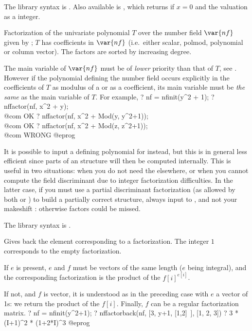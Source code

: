 The library syntax is .
Also available is
, which returns
 if $x = 0$ and the valuation as a  integer.

\label{se:nffactor}
Factorization of the univariate
polynomial $T$ over the number field $\var{nf}$ given by ; $T$
has coefficients in $\var{nf}$ (i.e.~either scalar, polmod, polynomial or
column vector). The factors are sorted by increasing degree.

The main variable of $\var{nf}$ must be of \emph{lower}
priority than that of $T$, see . However if
the polynomial defining the number field occurs explicitly  in the
coefficients of $T$ as modulus of a  or as a 
coefficient, its main variable must be \emph{the same} as the main variable
of $T$. For example,
\bprog
? nf = nfinit(y^2 + 1);
? nffactor(nf, x^2 + y); \\@com OK
? nffactor(nf, x^2 + Mod(y, y^2+1)); \\ @com OK
? nffactor(nf, x^2 + Mod(z, z^2+1)); \\ @com WRONG
@eprog

It is possible to input a defining polynomial for 
instead, but this is in general less efficient since parts of an 
structure will then be computed internally. This is useful in two
situations: when you do not need the  elsewhere, or when you cannot
compute the field discriminant due to integer factorization difficulties. In
the latter case, if you must use a partial discriminant factorization (as
allowed by both  or ) to build a partially correct
 structure, always input  to , and not your
makeshift : otherwise factors could be missed.

The library syntax is .

\label{se:nffactorback}
Gives back the  element corresponding to a factorization.
The integer $1$ corresponds to the empty factorization.

If $e$ is present, $e$ and $f$ must be vectors of the same length ($e$ being
integral), and the corresponding factorization is the product of the
$f[i]^{e[i]}$.

If not, and $f$ is vector, it is understood as in the preceding case with $e$
a vector of 1s: we return the product of the $f[i]$. Finally, $f$ can be a
regular factorization matrix.
\bprog
? nf = nfinit(y^2+1);
? nffactorback(nf, [3, y+1, [1,2]~], [1, 2, 3])
? 3 * (I+1)^2 * (1+2*I)^3
@eprog

